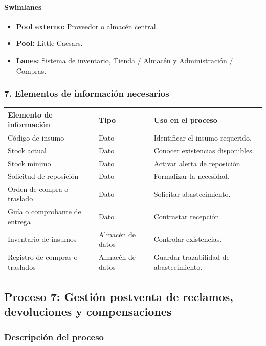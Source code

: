\documentclass[a4paper,12pt]{article}
\begin{document}
\paragraph{Swimlanes}

\begin{itemize}
    \item \textbf{Pool externo:} Proveedor o almacén central.
    \item \textbf{Pool:} Little Caesars.
    \item \textbf{Lanes:} Sistema de inventario, Tienda / Almacén y Administración / Compras.
\end{itemize}

\subsubsection*{7. Elementos de información necesarios}

\begin{longtable}{P{5cm} P{5cm} P{4cm}}
\toprule
\textbf{Elemento de información} & \textbf{Tipo} & \textbf{Uso en el proceso} \\
\midrule
Código de insumo & Dato & Identificar el insumo requerido. \\
Stock actual & Dato & Conocer existencias disponibles. \\
Stock mínimo & Dato & Activar alerta de reposición. \\
Solicitud de reposición & Dato & Formalizar la necesidad. \\
Orden de compra o traslado & Dato & Solicitar abastecimiento. \\
Guía o comprobante de entrega & Dato & Contrastar recepción. \\
Inventario de insumos & Almacén de datos & Controlar existencias. \\
Registro de compras o traslados & Almacén de datos & Guardar trazabilidad de abastecimiento. \\
\bottomrule
\end{longtable}

\subsection*{Proceso 7: Gestión postventa de reclamos, devoluciones y compensaciones}

\subsubsection*{Descripción del proceso}
\end{document}

